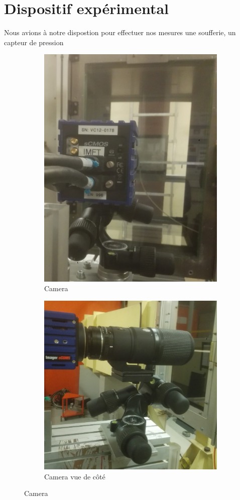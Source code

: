 \documentclass[french]{article}
\begin{document}
\section{Dispositif expérimental}
Nous avions à notre dispostion pour effectuer nos mesures une soufferie, un capteur de pression

\begin{figure}
\centering
\begin{subfigure}{.5\textwidth}
  \centering
  \includegraphics[width=.6\linewidth]{./image/Camera.jpg}
  \caption{Camera}
  \label{fig:sub1}
\end{subfigure}%
\begin{subfigure}{.5\textwidth}
  \centering
  \includegraphics[width=.6\linewidth]{./image/Camera2.jpg}
  \caption{Camera vue de côté}
  \label{fig:Camera}
\end{subfigure}
\caption{Camera}
\label{fig:Camera2}
\end{figure}
\end{document}
